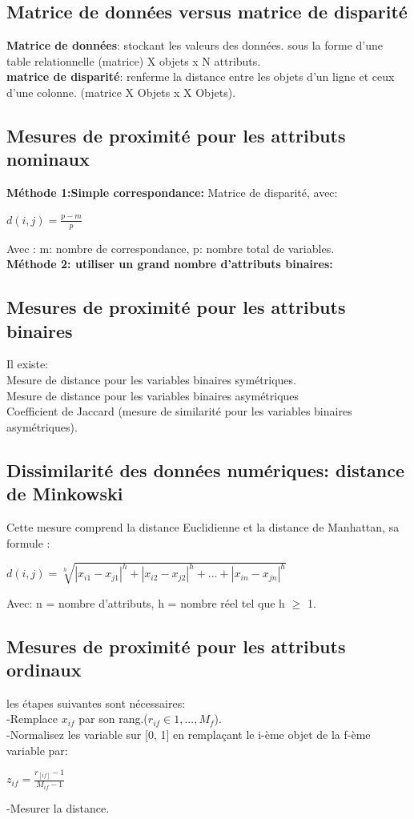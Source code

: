 \documentclass[12pt,a4paper,oneside]{book}
\begin{document}
\subsection{Matrice de données versus matrice de disparité}
\textbf{Matrice de données}: stockant les valeurs des données. sous la forme d'une table relationnelle (matrice) X objets x N attributs.\\

\textbf{ }
\textbf{matrice de disparité}: renferme la distance entre les objets d'un ligne et ceux d'une colonne. (matrice X Objets x X Objets).

\subsection{Mesures de proximité pour les attributs nominaux}
\textbf{Méthode 1:Simple correspondance:}
Matrice de disparité, avec:
\begin{center}
	$d(i,j) = \frac{p - m}{p} $
\end{center}
Avec : m: nombre de correspondance, p: nombre total de variables.\\
\textbf{Méthode 2: utiliser un grand nombre d'attributs binaires:}

\subsection{Mesures de proximité pour les attributs binaires}Il existe:\\
Mesure de distance pour les variables binaires symétriques.\\
Mesure de distance pour les variables binaires asymétriques\\
Coefficient de Jaccard (mesure de similarité pour les variables binaires asymétriques).\\

\subsection{Dissimilarité des données numériques: distance de Minkowski}
Cette mesure comprend la distance Euclidienne et la distance de Manhattan, sa formule : 
\begin{center}
	$d(i,j) = \sqrt[h]{|x_{i1}-x_{j1}|^h + |x_{i2}-x_{j2}|^h + ... + |x_{in}-x_{jn}|^h}$
\end{center}
Avec: n = nombre d'attributs, h = nombre réel tel que h $\geq$ 1.

\subsection{Mesures de proximité pour les attributs ordinaux}
les étapes suivantes sont nécessaires:\\
-Remplace $x_{if}$ par son rang.($r_{if} \in {1,...,M_{f}}$).\\
-Normalisez les variable sur [0, 1] en remplaçant le i-ème objet de la f-ème variable par:
\begin{center}
	$z_{if} = \frac{r_[if] - 1}{M_{if} - 1}$
\end{center}
-Mesurer la distance.
\end{document}
